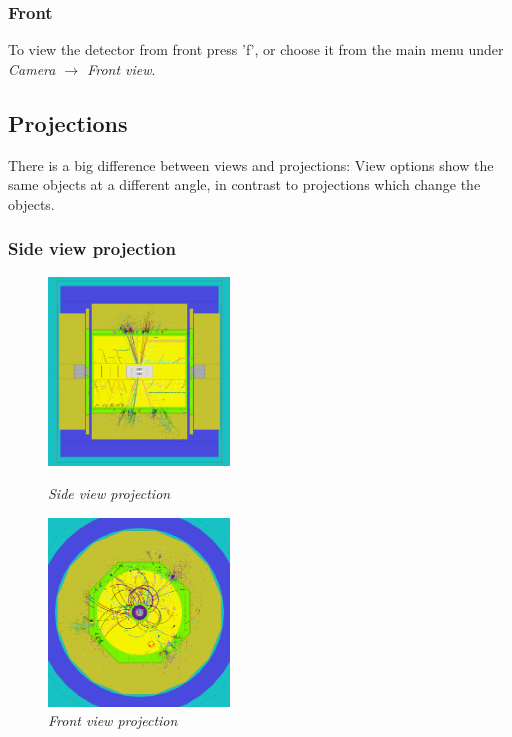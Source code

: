 \documentclass[a4paper,10pt]{article}
\begin{document}
\subsubsection{Front}
To view the detector from front press 'f', or choose it from the main menu under \textit{Camera $\to$ Front view}.

\subsection{Projections}
There is a big difference between views and projections: View options show the same objects at a different angle, in contrast to projections which change the objects. 

\subsubsection{Side view projection}
\begin{figure}
\begin{minipage}[t]{6cm}
\centerline{\includegraphics[height=5cm]{img/sideview.png}}
\caption{\label{CEDViewer} \textsl{Side view projection}}
\end{minipage}
\hfill
\begin{minipage}[t]{6cm}
\setlength{\fboxsep}{0mm}
\centerline{\includegraphics[height=5cm]{img/frontview.png}}
\caption{\label{DSTViewer}\textsl{Front view projection}}
\end{minipage}
\end{figure}
\end{document}
